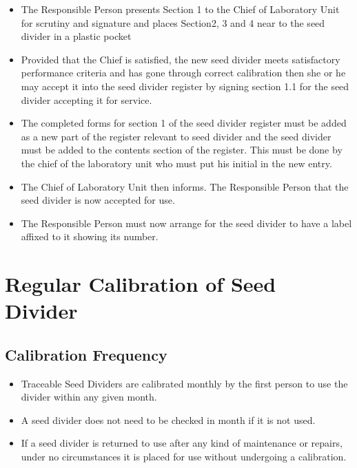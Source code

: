 \documentclass[]{book}
\providecommand{\tightlist}{%
  \setlength{\itemsep}{0pt}\setlength{\parskip}{0pt}}
\begin{document}
\begin{itemize}
\tightlist
\item
  The Responsible Person presents Section 1 to the Chief of Laboratory
  Unit for scrutiny and signature and places Section2, 3 and 4 near to
  the seed divider in a plastic pocket
\item
  Provided that the Chief is satisfied, the new seed divider meets
  satisfactory performance criteria and has gone through correct
  calibration then she or he may accept it into the seed divider
  register by signing section 1.1 for the seed divider accepting it for
  service.
\item
  The completed forms for section 1 of the seed divider register must be
  added as a new part of the register relevant to seed divider and the
  seed divider must be added to the contents section of the register.
  This must be done by the chief of the laboratory unit who must put his
  initial in the new entry.
\item
  The Chief of Laboratory Unit then informs. The Responsible Person that
  the seed divider is now accepted for use.
\item
  The Responsible Person must now arrange for the seed divider to have a
  label affixed to it showing its number.
\end{itemize}

\section{Regular Calibration of Seed
Divider}\label{regular-calibration-of-seed-divider}

\subsection{Calibration Frequency}\label{calibration-frequency}

\begin{itemize}
\tightlist
\item
  Traceable Seed Dividers are calibrated monthly by the first person to
  use the divider within any given month.
\item
  A seed divider does not need to be checked in month if it is not used.
\item
  If a seed divider is returned to use after any kind of maintenance or
  repairs, under no circumstances it is placed for use without
  undergoing a calibration.
\end{itemize}
\end{document}
